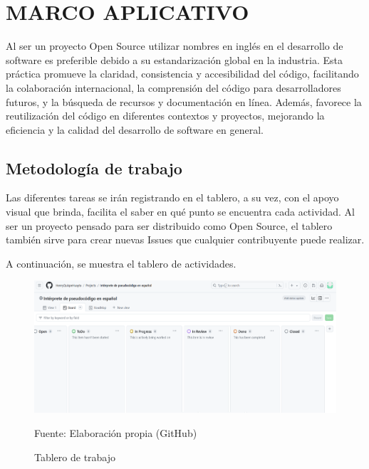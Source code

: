 \chapter{MARCO APLICATIVO}

Al ser un proyecto Open Source utilizar nombres en inglés en el desarrollo de software es preferible debido a su estandarización global en la industria. Esta práctica promueve la claridad, consistencia y accesibilidad del código, facilitando la colaboración internacional, la comprensión del código para desarrolladores futuros, y la búsqueda de recursos y documentación en línea. Además, favorece la reutilización del código en diferentes contextos y proyectos, mejorando la eficiencia y la calidad del desarrollo de software en general.

\section{Metodología de trabajo}
Las diferentes tareas se irán registrando en el tablero, a su vez, con el apoyo visual que brinda, facilita el saber en qué punto se encuentra cada actividad. Al ser un proyecto pensado para ser distribuido como Open Source, el tablero también sirve para crear nuevas Issues que cualquier contribuyente puede realizar.

A continuación, se muestra el tablero de actividades.
\begin{figure}[!h]
  \centering
  \includegraphics[width=1\textwidth]{images/tablero.png}
  \caption{Tablero de trabajo}
  \centering Fuente: Elaboración propia (GitHub)
  \label{fig:tablero}
\end{figure}
\newline
\newline
\newline

